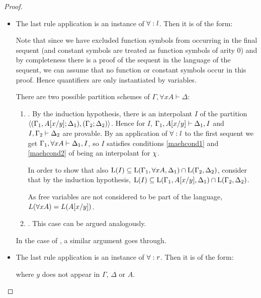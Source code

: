 \begin{proof}
\begin{description}
			\begin{itemize}
				\item The last rule application is an instance of $\operatorname{\forall}:l$. Then it is of the form:
					\begin{prooftree}
					\end{prooftree}
					Note that since we have excluded function symbols from occurring in the final sequent (and constant symbols are treated as function symbols of arity 0) and
					by completeness there is a proof of the sequent in the language of the sequent, we can assume that no function or constant symbols occur in this proof.
					Hence quantifiers are only instantiated by variables.

					There are two possible partition schemes of $\Gamma, \forall x A \vdash \Delta$:
					\begin{enumerate}
						\item \parti{\Gamma_1, \forall x A}{\Delta_1}{\Gamma_2}{\Delta_2}.
							By the induction hypothesis, there is an interpolant $I$ of the partition $ \langle (\Gamma_1, A[x/y]; \Delta_1), (\Gamma_2; \Delta_2)\rangle $.
							Hence for $I$, 
							$\Gamma_1, A[x/y] \vdash \Delta_1, I$ and  
							$I, \Gamma_2 \vdash \Delta_2$ are provable.
							By an application of $\operatorname{\forall}:l$ to the first sequent we get $\Gamma_1, \forall x A\vdash \Delta_1, I$, so $I$ satisfies conditions \ref{maehcond1} and \ref{maehcond2} of being an interpolant for $\chi$.

							In order to show that also $\operatorname{L}(I) \subseteq \operatorname{L}(\Gamma_1, \forall x A, \Delta_1) \cap \operatorname{L}(\Gamma_2, \Delta_2)$, consider that by the induction hypothesis, 
							$\operatorname{L}(I) \subseteq \operatorname{L}(\Gamma_1, A[x/y], \Delta_1) \cap \operatorname{L}(\Gamma_2, \Delta_2)$.

							As free variables are not considered to be part of the language, $L(\forall x A) = L(A[x/y])$.


						\item \parti{\Gamma_1}{\Delta_1}{\Gamma_2, \forall x A}{\Delta_2}.
							This case can be argued analogously.
					\end{enumerate}

					In the case of , a similar argument goes through.

				\item The last rule application is an instance of $\operatorname{\forall}:r$. Then it is of the form:\nopagebreak
					\begin{prooftree}
						\Axiomm{\Gamma\fCenter \Delta, A\subst{x/y} }
						\RightLabelm{\lkrule{\forall}{r}}
						\UnaryInfm{\Gamma\fCenter \Delta, \forall x A }
					\end{prooftree}
					where $y$ does not appear in $\Gamma$, $\Delta$ or $A$.


\end{itemize}
\end{description}
\end{proof}
